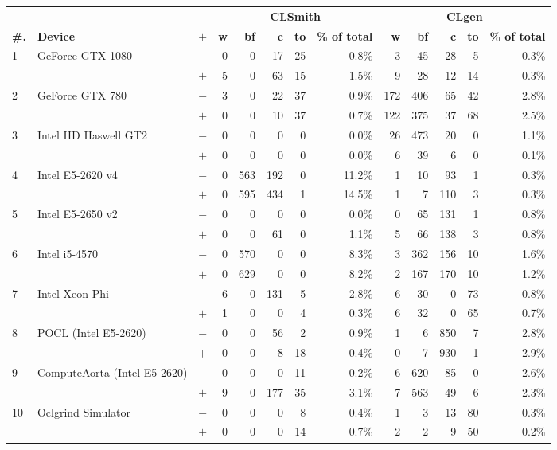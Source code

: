   \begin{tabular}{lll | rrrrr | rrrrr }
  \toprule
  & & & \multicolumn{5}{c|}{\textbf{CLSmith}} & \multicolumn{5}{c}{\textbf{CLgen}} \\
  \textbf{\#.} & \textbf{Device} & $\pm$ &
  \textbf{w} & \textbf{bf} & \textbf{c} & \textbf{to} & \textbf{\% of total} &
  \textbf{w} & \textbf{bf} & \textbf{c} & \textbf{to} & \textbf{\% of total} \\
  \midrule
  \multirow{ 2}{*}{1} & \multirow{ 2}{*}{GeForce GTX 1080} & $-$ & 0 & 0 & 17 & 25 & 0.8\%       & 3 & 45 & 28 & 5 & 0.3\% \\& & $+$ & 5 & 0 & 63 & 15 & 1.5\% & 9 & 28 & 12 & 14 & 0.3\% \\
\hline
\multirow{ 2}{*}{2} & \multirow{ 2}{*}{GeForce GTX 780} & $-$ & 3 & 0 & 22 & 37 & 0.9\%       & 172 & 406 & 65 & 42 & 2.8\% \\& & $+$ & 0 & 0 & 10 & 37 & 0.7\% & 122 & 375 & 37 & 68 & 2.5\% \\
\hline
\multirow{ 2}{*}{3} & \multirow{ 2}{*}{Intel HD Haswell GT2} & $-$ & 0 & 0 & 0 & 0 & 0.0\%       & 26 & 473 & 20 & 0 & 1.1\% \\& & $+$ & 0 & 0 & 0 & 0 & 0.0\% & 6 & 39 & 6 & 0 & 0.1\% \\
\hline
\multirow{ 2}{*}{4} & \multirow{ 2}{*}{Intel E5-2620 v4} & $-$ & 0 & 563 & 192 & 0 & 11.2\%       & 1 & 10 & 93 & 1 & 0.3\% \\& & $+$ & 0 & 595 & 434 & 1 & 14.5\% & 1 & 7 & 110 & 3 & 0.3\% \\
\hline
\multirow{ 2}{*}{5} & \multirow{ 2}{*}{Intel E5-2650 v2} & $-$ & 0 & 0 & 0 & 0 & 0.0\%       & 0 & 65 & 131 & 1 & 0.8\% \\& & $+$ & 0 & 0 & 61 & 0 & 1.1\% & 5 & 66 & 138 & 3 & 0.8\% \\
\hline
\multirow{ 2}{*}{6} & \multirow{ 2}{*}{Intel i5-4570} & $-$ & 0 & 570 & 0 & 0 & 8.3\%       & 3 & 362 & 156 & 10 & 1.6\% \\& & $+$ & 0 & 629 & 0 & 0 & 8.2\% & 2 & 167 & 170 & 10 & 1.2\% \\
\hline
\multirow{ 2}{*}{7} & \multirow{ 2}{*}{Intel Xeon Phi} & $-$ & 6 & 0 & 131 & 5 & 2.8\%       & 6 & 30 & 0 & 73 & 0.8\% \\& & $+$ & 1 & 0 & 0 & 4 & 0.3\% & 6 & 32 & 0 & 65 & 0.7\% \\
\hline
\multirow{ 2}{*}{8} & \multirow{ 2}{*}{POCL (Intel E5-2620)} & $-$ & 0 & 0 & 56 & 2 & 0.9\%       & 1 & 6 & 850 & 7 & 2.8\% \\& & $+$ & 0 & 0 & 8 & 18 & 0.4\% & 0 & 7 & 930 & 1 & 2.9\% \\
\hline
\multirow{ 2}{*}{9} & \multirow{ 2}{*}{ComputeAorta (Intel E5-2620)} & $-$ & 0 & 0 & 0 & 11 & 0.2\%       & 6 & 620 & 85 & 0 & 2.6\% \\& & $+$ & 9 & 0 & 177 & 35 & 3.1\% & 7 & 563 & 49 & 6 & 2.3\% \\
\hline
\multirow{ 2}{*}{10} & \multirow{ 2}{*}{Oclgrind Simulator} & $-$ & 0 & 0 & 0 & 8 & 0.4\%       & 1 & 3 & 13 & 80 & 0.3\% \\& & $+$ & 0 & 0 & 0 & 14 & 0.7\% & 2 & 2 & 9 & 50 & 0.2\% \\
  \bottomrule
\end{tabular}


